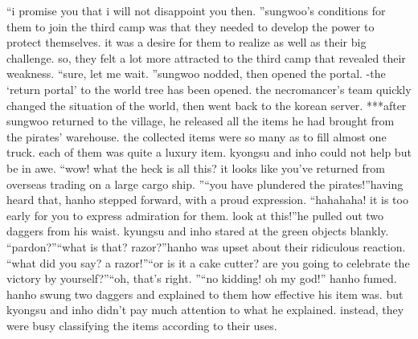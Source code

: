 “i promise you that i will not disappoint you then.
”sungwoo’s conditions for them to join the third camp was that they needed to develop the power to protect themselves.
 it was a desire for them to realize as well as their big challenge.
 so, they felt a lot more attracted to the third camp that revealed their weakness.
“sure, let me wait.
”sungwoo nodded, then opened the portal.
-the ‘return portal’ to the world tree has been opened.
the necromancer’s team quickly changed the situation of the world, then went back to the korean server.
***after sungwoo returned to the village, he released all the items he had brought from the pirates’ warehouse.
 the collected items were so many as to fill almost one truck.
 each of them was quite a luxury item.
kyongsu and inho could not help but be in awe.
“wow! what the heck is all this? it looks like you’ve returned from overseas trading on a large cargo ship.
”“you have plundered the pirates!”having heard that, hanho stepped forward, with a proud expression.
“hahahaha! it is too early for you to express admiration for them.
 look at this!”he pulled out two daggers from his waist.
 kyungsu and inho stared at the green objects blankly.
“pardon?”“what is that? razor?”hanho was upset about their ridiculous reaction.
“what did you say? a razor!”“or is it a cake cutter? are you going to celebrate the victory by yourself?”“oh, that’s right.
”“no kidding! oh my god!” hanho fumed.
hanho swung two daggers and explained to them how effective his item was.
but kyongsu and inho didn’t pay much attention to what he explained.
 instead, they were busy classifying the items according to their uses.


 